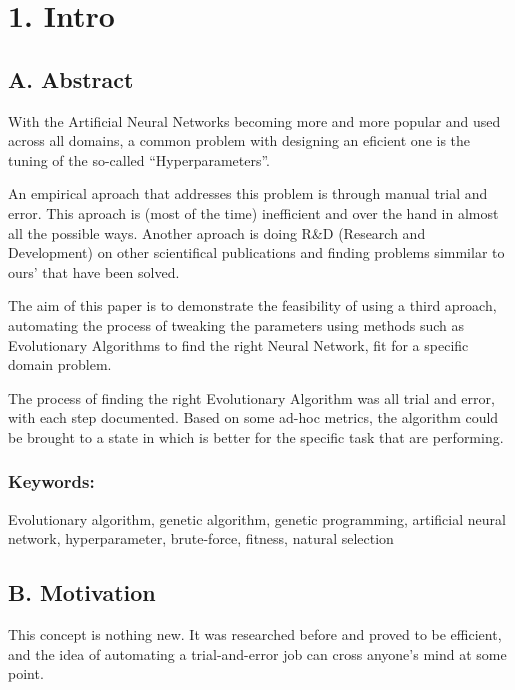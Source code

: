 \documentclass[11pt]{article}
\begin{document}
    \hypertarget{intro}{%
\section{1. Intro}\label{intro}}

    \hypertarget{a.-abstract}{%
\subsection{A. Abstract}\label{a.-abstract}}

With the Artificial Neural Networks becoming more and more popular and
used across all domains, a common problem with designing an eficient one
is the tuning of the so-called ``Hyperparameters''.

An empirical aproach that addresses this problem is through manual trial
and error. This aproach is (most of the time) inefficient and over the
hand in almost all the possible ways. Another aproach is doing R\&D
(Research and Development) on other scientifical publications and
finding problems simmilar to ours' that have been solved.

The aim of this paper is to demonstrate the feasibility of using a third
aproach, automating the process of tweaking the parameters using methods
such as Evolutionary Algorithms to find the right Neural Network, fit
for a specific domain problem.

The process of finding the right Evolutionary Algorithm was all trial
and error, with each step documented. Based on some ad-hoc metrics, the
algorithm could be brought to a state in which is better for the
specific task that are performing.

\hypertarget{keywords}{%
\subsubsection{Keywords:}\label{keywords}}

Evolutionary algorithm, genetic algorithm, genetic programming,
artificial neural network, hyperparameter, brute-force, fitness, natural
selection

    \hypertarget{b.-motivation}{%
\subsection{B. Motivation}\label{b.-motivation}}

    This concept is nothing new. It was researched before and proved to be
efficient, and the idea of automating a trial-and-error job can cross
anyone's mind at some point.
\end{document}
